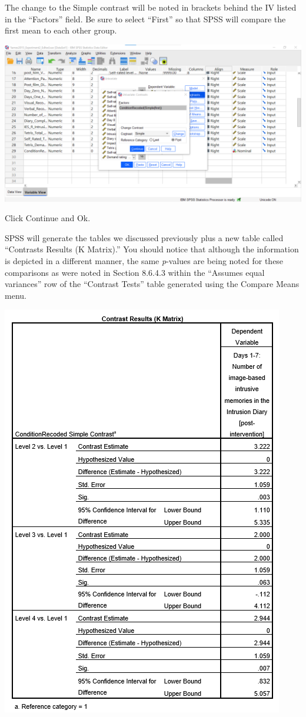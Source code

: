 \documentclass[
]{book}
\begin{document}
The change to the Simple contrast will be noted in brackets behind the IV listed in the ``Factors'' field. Be sure to select ``First'' so that SPSS will compare the first mean to each other group.

\includegraphics{img/8.6.6.46.png}

Click {Continue} and {Ok}.

SPSS will generate the tables we discussed previously plus a new table called ``Contrasts Results (K Matrix).'' You should notice that although the information is depicted in a different manner, the same \emph{p}-values are being noted for these comparisons as were noted in Section 8.6.4.3 within the ``Assumes equal variances'' row of the ``Contrast Tests'' table generated using the {Compare Means} menu.

\includegraphics{img/8.6.6.47.png}
\end{document}
